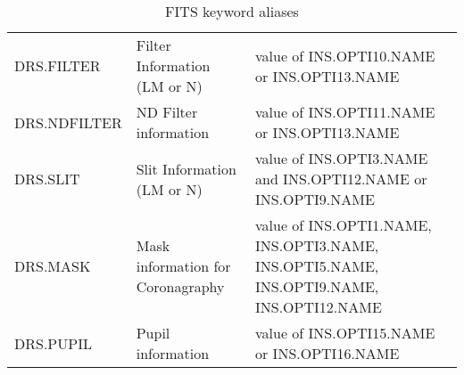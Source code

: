   {\footnotesize
\begin{longtable}    [c]{|p{3cm}|p{4cm}|p{4cm}|}
      \caption{FITS keyword aliases}
  	\endfirsthead
     \hline
DRS.FILTER	& Filter Information (LM or N)	& value of INS.OPTI10.NAME or INS.OPTI13.NAME\\
DRS.NDFILTER	& ND Filter information	        & value of INS.OPTI11.NAME or INS.OPTI13.NAME\\
DRS.SLIT	& Slit Information (LM or N)	& value of INS.OPTI3.NAME and INS.OPTI12.NAME or  INS.OPTI9.NAME\\
DRS.MASK	& Mask information for Coronagraphy	& value of INS.OPTI1.NAME, INS.OPTI3.NAME, INS.OPTI5.NAME, INS.OPTI9.NAME, INS.OPTI12.NAME \\
DRS.PUPIL	& Pupil information	& value of INS.OPTI15.NAME or INS.OPTI16.NAME\\
\hline
    \end{longtable}
  }


